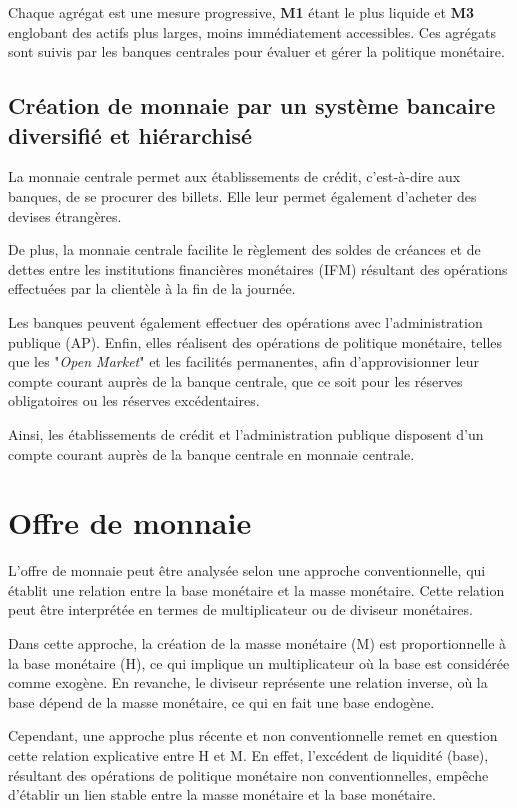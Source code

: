 \documentclass[a4paper, 12pt]{report}
\begin{document}
Chaque agrégat est une mesure progressive, \textbf{M1} étant le plus liquide et \textbf{M3} englobant des actifs plus larges, moins immédiatement accessibles. Ces agrégats sont suivis par les banques centrales pour évaluer et gérer la politique monétaire.
	
	
\subsection{Création de monnaie par un système bancaire diversifié et hiérarchisé}

La monnaie centrale permet aux établissements de crédit, c'est-à-dire aux banques, de se procurer des billets. Elle leur permet également d'acheter des devises étrangères. 

De plus, la monnaie centrale facilite le règlement des soldes de créances et de dettes entre les institutions financières monétaires (IFM) résultant des opérations effectuées par la clientèle à la fin de la journée. 

Les banques peuvent également effectuer des opérations avec l'administration publique (AP). Enfin, elles réalisent des opérations de politique monétaire, telles que les "\textit{Open Market}" et les facilités permanentes, afin d'approvisionner leur compte courant auprès de la banque centrale, que ce soit pour les réserves obligatoires ou les réserves excédentaires.

Ainsi, les établissements de crédit et l'administration publique disposent d'un compte courant auprès de la banque centrale en monnaie centrale.
	
\section{Offre de monnaie}

L'offre de monnaie peut être analysée selon une approche conventionnelle, qui établit une relation entre la base monétaire et la masse monétaire. Cette relation peut être interprétée en termes de multiplicateur ou de diviseur monétaires. 

Dans cette approche, la création de la masse monétaire (M) est proportionnelle à la base monétaire (H), ce qui implique un multiplicateur où la base est considérée comme exogène. En revanche, le diviseur représente une relation inverse, où la base dépend de la masse monétaire, ce qui en fait une base endogène.

Cependant, une approche plus récente et non conventionnelle remet en question cette relation explicative entre H et M. En effet, l'excédent de liquidité (base), résultant des opérations de politique monétaire non conventionnelles, empêche d'établir un lien stable entre la masse monétaire et la base monétaire.
\end{document}
